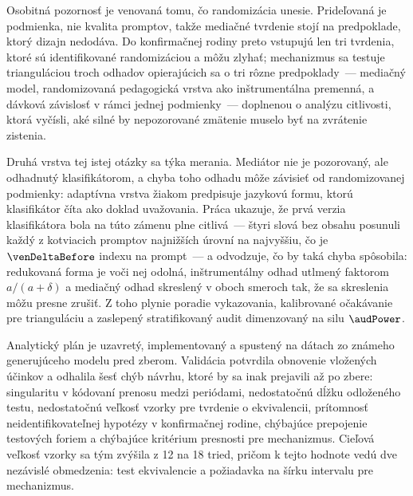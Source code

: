 Osobitná pozornosť je venovaná tomu, čo randomizácia unesie. Prideľovaná je podmienka, nie kvalita promptov, takže mediačné tvrdenie stojí na predpoklade, ktorý dizajn nedodáva. Do konfirmačnej rodiny preto vstupujú len tri tvrdenia, ktoré sú identifikované randomizáciou a môžu zlyhať; mechanizmus sa testuje trianguláciou troch odhadov opierajúcich sa o tri rôzne predpoklady~--- mediačný model, randomizovaná pedagogická vrstva ako inštrumentálna premenná, a dávková závislosť v rámci jednej podmienky~--- doplnenou o analýzu citlivosti, ktorá vyčísli, aké silné by nepozorované zmätenie muselo byť na zvrátenie zistenia.

Druhá vrstva tej istej otázky sa týka merania. Mediátor nie je pozorovaný, ale odhadnutý klasifikátorom, a chyba toho odhadu môže závisieť od randomizovanej podmienky: adaptívna vrstva žiakom predpisuje jazykovú formu, ktorú klasifikátor číta ako doklad uvažovania. Práca ukazuje, že prvá verzia klasifikátora bola na túto zámenu plne citlivá~--- štyri slová bez obsahu posunuli každý z \venN{} kotviacich promptov najnižších úrovní na najvyššiu, čo je $\venDeltaBefore$ indexu na prompt~--- a odvodzuje, čo by taká chyba spôsobila: redukovaná forma je voči nej odolná, inštrumentálny odhad utlmený faktorom $a/(a+\delta)$ a mediačný odhad skreslený v oboch smeroch tak, že sa skreslenia môžu presne zrušiť. Z toho plynie poradie vykazovania, kalibrované očakávanie pre trianguláciu a zaslepený stratifikovaný audit dimenzovaný na silu $\audPower$.

Analytický plán je uzavretý, implementovaný a spustený na dátach zo známeho generujúceho modelu pred zberom. Validácia potvrdila obnovenie vložených účinkov a odhalila šesť chýb návrhu, ktoré by sa inak prejavili až po zbere: singularitu v kódovaní prenosu medzi periódami, nedostatočnú dĺžku odloženého testu, nedostatočnú veľkosť vzorky pre tvrdenie o ekvivalencii, prítomnosť neidentifikovateľnej hypotézy v konfirmačnej rodine, chýbajúce prepojenie testových foriem a chýbajúce kritérium presnosti pre mechanizmus. Cieľová veľkosť vzorky sa tým zvýšila z 12 na 18 tried, pričom k tejto hodnote vedú dve nezávislé obmedzenia: test ekvivalencie a požiadavka na šírku intervalu pre mechanizmus.
